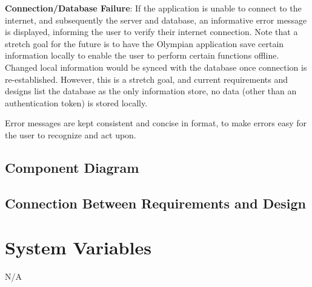 \documentclass[12pt, titlepage]{article}
\begin{document}
	\textbf{Connection/Database Failure}: If the application is unable to connect to the internet, and subsequently the server and database, an informative error message is displayed, informing the user to verify their internet connection. Note that a stretch goal for the future is to have the Olympian application save certain information locally to enable the user to perform certain functions offline. Changed local information would be synced with the database once connection is re-established. However, this is a stretch goal, and current requirements and designs list the database as the only information store, no data (other than an authentication token) is stored locally.
	
	Error messages are kept consistent and concise in format, to make errors easy for the user to recognize and act upon.
	
	
	
	
	
	\subsection{Component Diagram}
	
	\subsection{Connection Between Requirements and Design} \label{SecConnection}
	
	
	\section{System Variables}
	
	N/A
	
	
	
\end{document}
